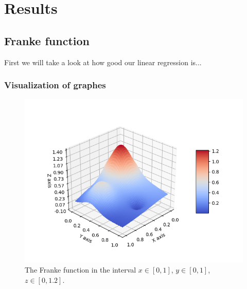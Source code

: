 \section{Results} \label{sec:results}

\subsection{Franke function}
First we will take a look at how good our linear regression is...
\subsubsection{Visualization of graphes}

 \begin{figure} [H]
 	\centering
 	\includegraphics[scale=0.8]{../plots/franke.png}
 	\caption{The Franke function in the interval $x\in[0,1]$, $y\in[0,1]$, $z\in[0, 1.2]$.}
 	\label{fig:franke}
 \end{figure}

